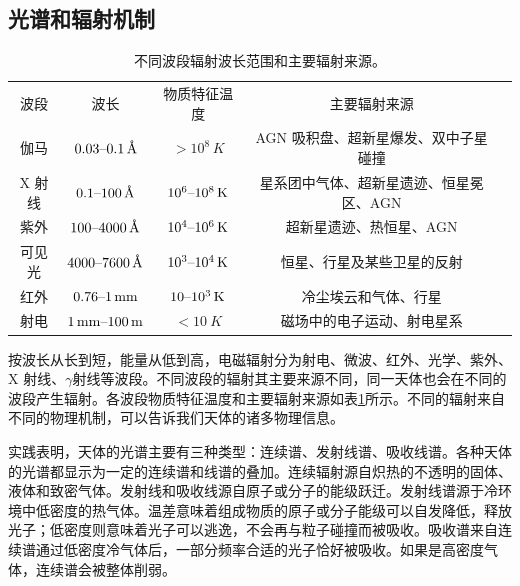 \documentclass[../天体物理基础.tex]{subfiles}
\begin{document}
\subsection{光谱和辐射机制}
\begin{table}[!htbp]
\centering
\caption{不同波段辐射波长范围和主要辐射来源。}
\begin{tabular}{c c c c c}
\hline
波段 & 波长 & 物质特征温度 & 主要辐射来源\\
\cline{1-4}
伽马 & $0.03\text{\textendash}0.1\,\si{\angstrom}$ & $>10^{8}\,\unit{K}$ & AGN 吸积盘、超新星爆发、双中子星碰撞\\
\cline{1-4}
X 射线 & $0.1\text{\textendash}100\,\si{\angstrom}$ & $10^{6}\text{\textendash}10^{8}\,\unit{K}$ & 星系团中气体、超新星遗迹、恒星冕区、AGN\\
\cline{1-4}
紫外 & $100\text{\textendash}4000\,\si{\angstrom}$ & $10^{4}\text{\textendash}10^{6}\,\unit{K}$ & 超新星遗迹、热恒星、AGN\\
\cline{1-4}
可见光 & $4000\text{\textendash}7600\,\si{\angstrom}$ & $10^{3}\text{\textendash}10^{4}\,\unit{K}$ & 恒星、行星及某些卫星的反射\\
\cline{1-4}
红外 & $0.76\text{\textendash}\qty{1}{mm}$ & $10\text{\textendash}10^{3}\,\unit{K}$ & 冷尘埃云和气体、行星\\
\cline{1-4}
射电 & $\qty{1}{mm}\text{\textendash}\qty{100}{m}$ & $<\qty{10}{K}$ & 磁场中的电子运动、射电星系\\
\cline{1-4}
\end{tabular}
\label{不同波段辐射波长范围和主要辐射来源。}
\end{table}

按波长从长到短，能量从低到高，电磁辐射分为射电、微波、红外、光学、紫外、X 射线、$\gamma$射线等波段。不同波段的辐射其主要来源不同，同一天体也会在不同的波段产生辐射。各波段物质特征温度和主要辐射来源如表\ref{不同波段辐射波长范围和主要辐射来源。}所示。不同的辐射来自不同的物理机制，可以告诉我们天体的诸多物理信息。

实践表明，天体的光谱主要有三种类型：连续谱、发射线谱、吸收线谱。各种天体的光谱都显示为一定的连续谱和线谱的叠加。连续辐射源自炽热的不透明的固体、液体和致密气体。发射线和吸收线源自原子或分子的能级跃迁。发射线谱源于冷环境中低密度的热气体。温差意味着组成物质的原子或分子能级可以自发降低，释放光子；低密度则意味着光子可以逃逸，不会再与粒子碰撞而被吸收。吸收谱来自连续谱通过低密度冷气体后，一部分频率合适的光子恰好被吸收。如果是高密度气体，连续谱会被整体削弱。
\end{document}
